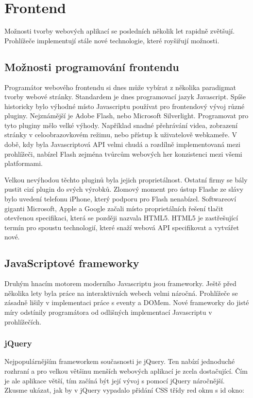 \chapter{Frontend}

Možnosti tvorby webových aplikací se posledních několik let rapidně zvětšují. Prohlížeče implementují stále nové technologie, které royšiřují možnosti.

\section{Možnosti programování frontendu}

Programátor webového frontendu si dnes může vybírat z několika paradigmat tvorby webové stránky. Standardem je dnes programovací jazyk Javascript. Spíše historicky bylo výhodné místo Javascriptu používat pro frontendový vývoj různé pluginy. Nejznámější je Adobe Flash, nebo Microsoft Silverlight. Programovat pro tyto pluginy mělo velké výhody. Například snadné přehrávání videa, zobrazení stránky v celoobrazovkovém režimu, nebo přístup k uživatelově webkameře. V době, kdy byla Javascriptová API velmi chudá a rozdílně implementovaná mezi prohlížeči, nabízel Flash zejména tvůrcům webových her konzistenci mezi všemi platformami.

Velkou nevýhodou těchto pluginů byla jejich proprietálnost. Ostatní firmy se bály pustit cizí plugin do svých výrobků. Zlomový moment pro ústup Flashe ze slávy bylo uvedení telefonu iPhone, který podporu pro Flash nenabízel. Softwareoví giganti Microsoft, Apple a Google začali místo proprietálních řešení tlačit otevřenou specifikaci, která se později nazvala HTML5. HTML5 je zastřešující termín pro spoustu technologií, které snaží webová API specifikovat a vytvářet nové.

\section{JavaScriptové frameworky}

Druhým hnacím motorem moderního Javascriptu jsou frameworky. Ještě před několika lety byla práce na interaktivních webech velmi náročná. Prohlížeče se zásadně lišily v implementaci práce s eventy a DOMem. Nové frameworky do jisté míry odstínily programátora od odlišných implementací Javascriptu v prohlížečích.

\subsection{jQuery}
Nejpopulárnějším frameworkem současnosti je jQuery. Ten nabízí jednoduché rozhraní a pro velkou většinu menších webových aplikací je zcela dostačující. Čím je ale aplikace větší, tím začíná být její vývoj s pomocí jQuery náročnější. Zkusme ukázat, jak by v jQuery vypadalo přidání CSS třídy red oknu s id okno:

